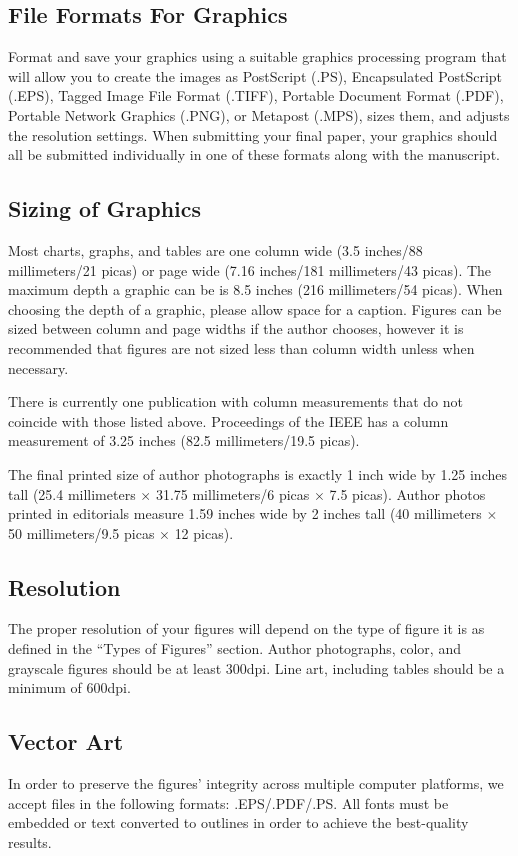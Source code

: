 \documentclass{ieeeaccess}
\begin{document}
\subsection{File Formats For Graphics}\label{formats}
Format and save your graphics using a suitable graphics processing program
that will allow you to create the images as PostScript (.PS), Encapsulated
PostScript (.EPS), Tagged Image File Format (.TIFF), Portable Document
Format (.PDF), Portable Network Graphics (.PNG), or Metapost (.MPS), sizes them, and adjusts
the resolution settings. When
submitting your final paper, your graphics should all be submitted
individually in one of these formats along with the manuscript.

\subsection{Sizing of Graphics}
Most charts, graphs, and tables are one column wide (3.5 inches/88
millimeters/21 picas) or page wide (7.16 inches/181 millimeters/43
picas). The maximum depth a graphic can be is 8.5 inches (216 millimeters/54
picas). When choosing the depth of a graphic, please allow space for a
caption. Figures can be sized between column and page widths if the author
chooses, however it is recommended that figures are not sized less than
column width unless when necessary.

There is currently one publication with column measurements that do not
coincide with those listed above. Proceedings of the IEEE has a column
measurement of 3.25 inches (82.5 millimeters/19.5 picas).

The final printed size of author photographs is exactly
1 inch wide by 1.25 inches tall (25.4 millimeters$\,\times\,$31.75 millimeters/6
picas$\,\times\,$7.5 picas). Author photos printed in editorials measure 1.59 inches
wide by 2 inches tall (40 millimeters$\,\times\,$50 millimeters/9.5 picas$\,\times\,$12
picas).

\subsection{Resolution }
The proper resolution of your figures will depend on the type of figure it
is as defined in the ``Types of Figures'' section. Author photographs,
color, and grayscale figures should be at least 300dpi. Line art, including
tables should be a minimum of 600dpi.

\subsection{Vector Art}
In order to preserve the figures' integrity across multiple computer
platforms, we accept files in the following formats: .EPS/.PDF/.PS. All
fonts must be embedded or text converted to outlines in order to achieve the
best-quality results.
\end{document}
